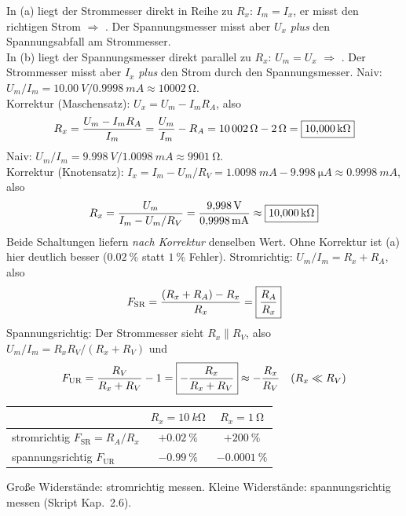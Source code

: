 \documentclass[11pt,a4paper]{article}
\begin{document}
\begin{loesung}
In (a) liegt der Strommesser direkt in Reihe zu $R_x$: $I_m = I_x$, er misst den richtigen Strom $\Rightarrow$ . Der Spannungsmesser misst aber $U_x$ \emph{plus} den Spannungsabfall am Strommesser.\\
In (b) liegt der Spannungsmesser direkt parallel zu $R_x$: $U_m = U_x$ $\Rightarrow$ . Der Strommesser misst aber $I_x$ \emph{plus} den Strom durch den Spannungsmesser.
Naiv: $U_m/I_m = \SI{10.00}{V}/\SI{0.9998}{mA} \approx \SI{10002}{\ohm}$.\\
Korrektur (Maschensatz): $U_x = U_m - I_m R_A$, also
\[
  R_x = \frac{U_m - I_m R_A}{I_m} = \frac{U_m}{I_m} - R_A = \SI{10002}{\ohm}-\SI{2}{\ohm} = \boxed{\SI{10.000}{k\ohm}}
\]
Naiv: $U_m/I_m = \SI{9.998}{V}/\SI{1.0098}{mA} \approx \SI{9901}{\ohm}$.\\
Korrektur (Knotensatz): $I_x = I_m - U_m/R_V = \SI{1.0098}{mA} - \SI{9.998}{\micro A} \approx \SI{0.9998}{mA}$, also
\[
  R_x = \frac{U_m}{I_m - U_m/R_V} = \frac{\SI{9.998}{V}}{\SI{0.9998}{mA}} \approx \boxed{\SI{10.000}{k\ohm}}
\]
Beide Schaltungen liefern \emph{nach Korrektur} denselben Wert. Ohne Korrektur ist (a) hier deutlich besser ($\SI{0.02}{\percent}$ statt $\SI{1}{\percent}$ Fehler).
Stromrichtig: $U_m/I_m = R_x + R_A$, also
\[
  F_\text{SR} = \frac{(R_x+R_A)-R_x}{R_x} = \boxed{\frac{R_A}{R_x}}
\]
Spannungsrichtig: Der Strommesser sieht $R_x\parallel R_V$, also $U_m/I_m = R_x R_V/(R_x+R_V)$ und
\[
  F_\text{UR} = \frac{R_V}{R_x+R_V}-1 = \boxed{-\frac{R_x}{R_x+R_V}} \approx -\frac{R_x}{R_V}\quad(R_x\ll R_V)
\]
\begin{center}
\begin{tabular}{lcc}
\toprule
 & $R_x = \SI{10}{k\ohm}$ & $R_x = \SI{1}{\ohm}$\\\midrule
stromrichtig $F_\text{SR} = R_A/R_x$ & $+\SI{0.02}{\percent}$ & $+\SI{200}{\percent}$\\
spannungsrichtig $F_\text{UR}$ & $-\SI{0.99}{\percent}$ & $-\SI{0.0001}{\percent}$\\\bottomrule
\end{tabular}
\end{center}
Große Widerstände: stromrichtig messen. Kleine Widerstände: spannungsrichtig messen (Skript Kap.~2.6).

\end{loesung}
\end{document}
